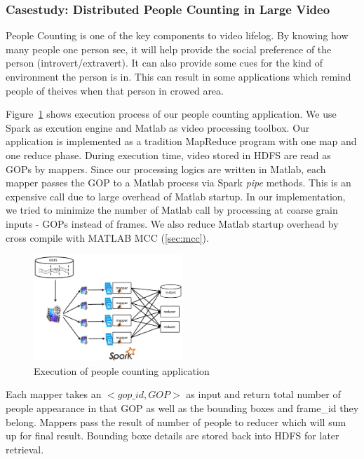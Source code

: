 \subsubsection{Casestudy: Distributed People Counting in Large Video}
People Counting is one of the key components to video lifelog. By knowing how
many people one person see, it will help provide the social preference of the
person (introvert/extravert). It can also provide some cues for the kind of
environment the person is in. This can result in some applications which remind
people of theives when that person in crowed area.

Figure~\ref{fig:overview} shows execution process of our people counting
application. We use Spark as excution engine and Matlab as video processing
toolbox. Our application is implemented as a tradition MapReduce program with
one map and one reduce phase. During execution time, video stored in HDFS are read as GOPs by mappers. Since our processing logics are written in Matlab,
each mapper passes the GOP to a Matlab process via Spark \textit{pipe} methods.
This is an expensive call due to large overhead of Matlab startup. In our
implementation, we tried to minimize the number of Matlab call by processing at
coarse grain inputs - GOPs instead of frames. We also reduce Matlab startup
overhead by cross compile with MATLAB MCC (\textsection\ref{sec:mcc}).
\begin{figure}[htbp!]\centering
\vspace{-1ex}
\includegraphics[width=0.5\textwidth]{figures/overview.pdf}
\vspace{-4ex}
\caption{Execution of people counting application}
\label{fig:overview}
\end{figure}

Each mapper takes an $<gop\_id, GOP>$ as input and return total number of people
appearance in that GOP as well as the bounding boxes and frame\_id they belong.
Mappers pass the result of number of people to reducer which will sum up for
final result. Bounding boxe details are stored back into HDFS for later
retrieval.

